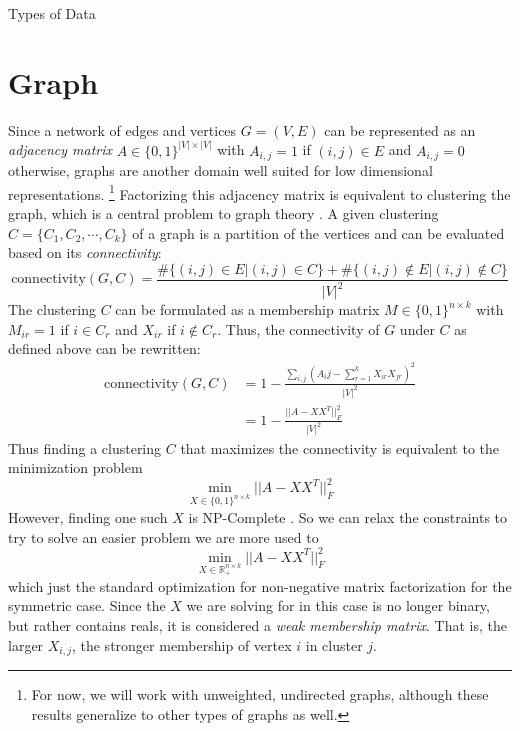 \documentclass[12pt]{pom_thesis}
\begin{document}
\begin{chapter}{Types of Data}
\section{Graph}
Since a network of edges and vertices $G=(V,E)$ can be represented as an \textit{adjacency matrix} $A \in \{0,1\}^{|V| \times |V|}$ with $A_{i,j} = 1$ if $(i,j) \in E$ and $A_{i,j}=0$ otherwise, graphs are another domain well suited for low dimensional representations. \footnote{For now, we will work with unweighted, undirected graphs, although these results generalize to other types of graphs as well.} Factorizing this adjacency matrix is equivalent to clustering the graph, which is a central problem to graph theory \cite{ho2008nonnegative}.
A given clustering $C = \{C_1, C_2, \cdots, C_k\}$ of a graph is a partition of the vertices and can be evaluated based on its \textit{connectivity}:
$$\text{connectivity}(G,C) = \frac{\#\{(i,j)\in E | (i,j) \in C\} + \#\{(i,j)\not\in E | (i,j) \not\in C\}}{|V|^2}$$
The clustering $C$ can be formulated as a membership matrix $M \in \{0,1\}^{n \times k}$ with $M_{ir}=1$ if $i \in C_r$ and $X_{ir}$ if $i \not\in C_r$. Thus, the connectivity of $G$ under $C$ as defined above can be rewritten:
\begin{align*}\text{connectivity}(G,C)  &= 1-\frac{\sum_{i,j} \left(A_ij - \sum_{r=1}^k X_{ir}X_{jr}\right)^2}{|V|^2}\\
&=1-\frac{||A-XX^T||^2_F}{|V|^2}
\end{align*}
Thus finding a clustering $C$ that maximizes the connectivity is equivalent to the minimization problem 
$$\min_{X \in \{0,1\}^{n\times k}} ||A-XX^T||^2_F$$
However, finding one such $X$ is NP-Complete \cite{vavasis2009complexity}. So we can relax the constraints to try to solve an easier problem we are more used to 
$$\min_{X \in \mathbb{R}_{+}^{n\times k}} ||A-XX^T||^2_F$$
which just the standard optimization for non-negative matrix factorization for the symmetric case. Since the $X$ we are solving for in this case is no longer binary, but rather contains reals, it is considered a \textit{weak membership matrix}. That is, the larger $X_{i,j}$, the stronger membership of vertex $i$ in cluster $j$. 

\end{chapter}
\end{document}
